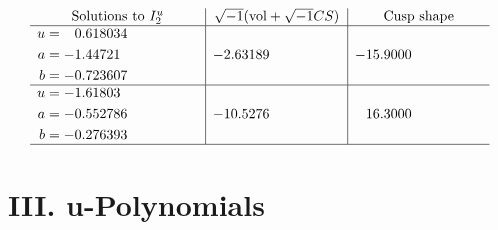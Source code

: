 \documentclass[1p]{elsarticle_modified}
\theoremstyle{definition}
\newcommand{\I}{\sqrt{-1}}
\begin{document}
$$\begin{array}{c|c|c}  
\text{Solutions to }I^u_{2}& \I (\text{vol} + \sqrt{-1}CS) & \text{Cusp shape}\\
 \hline 
\begin{aligned}
u &= \phantom{-}0.618034\phantom{ +0.000000I} \\
a &= -1.44721\phantom{ +0.000000I} \\
b &= -0.723607\phantom{ +0.000000I}\end{aligned}
 & -2.63189\phantom{ +0.000000I} & -15.9000\phantom{ +0.000000I} \\ \hline\begin{aligned}
u &= -1.61803\phantom{ +0.000000I} \\
a &= -0.552786\phantom{ +0.000000I} \\
b &= -0.276393\phantom{ +0.000000I}\end{aligned}
 & -10.5276\phantom{ +0.000000I} & \phantom{-}16.3000\phantom{ +0.000000I}\\
 \hline 
 \end{array}$$\newpage
\newpage\renewcommand{\arraystretch}{1}
\centering \section*{ III. u-Polynomials}
\end{document}
